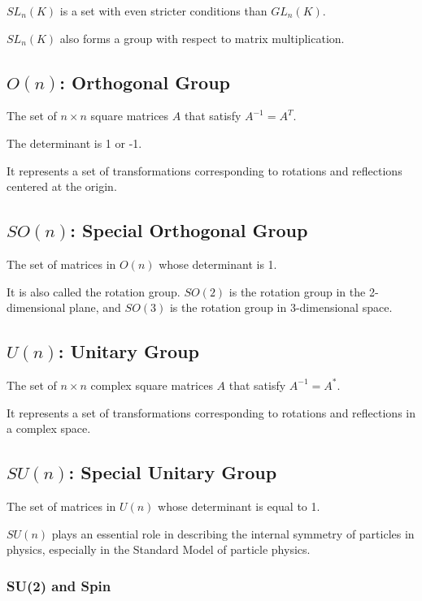 \documentclass[uplatex,a4j,12pt,dvipdfmx]{jsarticle}
\begin{document}
$SL_{n}(K)$ is a set with even stricter conditions than $GL_{n}(K)$.

$SL_{n}(K)$ also forms a group with respect to matrix multiplication.

\subsection{\textbf{$O(n)$: Orthogonal Group}}

The set of $n \times n$ square matrices $A$ that satisfy $A^{-1} = A^{T}$.

The determinant is 1 or -1.

It represents a set of transformations corresponding to rotations and reflections centered at the origin.

\subsection{\textbf{$SO(n)$: Special Orthogonal Group}}

The set of matrices in $O(n)$ whose determinant is 1.

It is also called the rotation group.
$SO(2)$ is the rotation group in the 2-dimensional plane, and
$SO(3)$ is the rotation group in 3-dimensional space.

\subsection{\textbf{$U(n)$: Unitary Group}}

The set of $n \times n$ complex square matrices $A$ that satisfy $A^{-1} = A^{*}$.

It represents a set of transformations corresponding to rotations and reflections in a complex space.

\subsection{\textbf{$SU(n)$: Special Unitary Group}}

The set of matrices in $U(n)$ whose determinant is equal to 1.

$SU(n)$ plays an essential role in describing the internal symmetry of particles in physics, especially in the Standard Model of particle physics.

\subsubsection{\textbf{SU(2) and Spin}}
\end{document}
